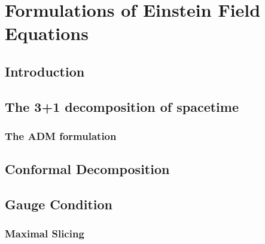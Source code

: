
\chapter{Formulations of Einstein Field Equations}  %

\ifpdf
    \graphicspath{{Chapter2/Figs/PDF/}{Chapter2/Figs/}}
\else
    \graphicspath{{Chapter2/Figs/}}
\fi


\section{Introduction} %
\label{section2.1}

\section{The 3+1 decomposition of spacetime} %
\label{section2.2}

\subsection{The ADM formulation} %
\label{section2.2.1}

\section{Conformal Decomposition} %
\label{section2.3}

\section{Gauge Condition}  %
\label{section2.4}

\subsection{Maximal Slicing} 
\label{section2.4.1}

